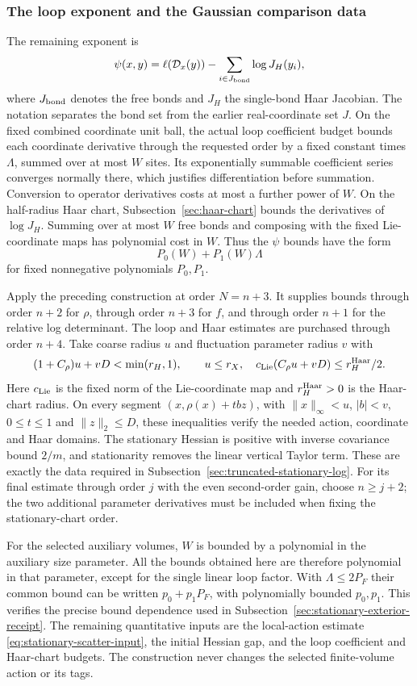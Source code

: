 \subsubsection{The loop exponent and the Gaussian comparison data}
The remaining exponent is
\[
      \psi(x,y)=\ell({\cal D}_x(y))-
                              \sum_{i\in J_{\rm bond}}\log J_H(y_i),
\]
where $J_{\rm bond}$ denotes the free bonds and $J_H$ the
single-bond Haar Jacobian. The notation separates the bond set
from the earlier real-coordinate set $J$.
On the fixed combined coordinate unit ball, the actual loop
coefficient budget bounds each coordinate derivative through the
requested order by a fixed constant times $\Lambda$, summed over
at most $W$ sites. Its exponentially summable coefficient series
converges normally there, which justifies differentiation before
summation. Conversion to operator derivatives costs at most a
further power of $W$. On the half-radius Haar chart,
Subsection~\ref{sec:haar-chart} bounds the derivatives of $\log J_H$.
Summing over at most $W$ free bonds and composing with the fixed
Lie-coordinate maps has polynomial cost in $W$. Thus the
$\psi$ bounds have the form
\[
                       P_0(W)+P_1(W)\Lambda
\]
for fixed nonnegative polynomials $P_0,P_1$.

Apply the preceding construction at order $N=n+3$. It supplies
bounds through order $n+2$ for $\rho$, through order $n+3$ for
$f$, and through order $n+1$ for the relative log determinant.
The loop and Haar estimates are purchased through order $n+4$.
Take coarse radius $u$ and fluctuation parameter radius $v$ with
\[
 (1+C_\rho)u+vD<\min(r_H,1),\qquad u\le r_X,
 \quad c_{\rm Lie}(C_\rho u+vD)\le r_H^{\rm Haar}/2.
\]
Here $c_{\rm Lie}$ is the fixed norm of the Lie-coordinate map
and $r_H^{\rm Haar}>0$ is the Haar-chart radius. On every segment
$(x,\rho(x)+tbz)$, with $\|x\|_\infty<u$, $|b|<v$,
$0\le t\le1$ and $\|z\|_2\le D$, these inequalities verify the
needed action, coordinate and Haar domains. The stationary
Hessian is positive with inverse covariance bound $2/m$, and
stationarity removes the linear vertical Taylor term.
These are exactly the data required in
Subsection~\ref{sec:truncated-stationary-log}. For its final estimate
through order $j$ with the even second-order gain, choose $n\ge j+2$;
the two additional parameter derivatives must be included when fixing
the stationary-chart order.

For the selected auxiliary volumes, $W$ is bounded by a polynomial
in the auxiliary size parameter. All the bounds obtained here are
therefore polynomial in that parameter, except for the single
linear loop factor. With $\Lambda\le2P_F$ their common bound can
be written $p_0+p_1P_F$, with polynomially bounded $p_0,p_1$.
This verifies the precise bound dependence used in
Subsection~\ref{sec:stationary-exterior-receipt}. The remaining
quantitative inputs are the local-action estimate
\eqref{eq:stationary-scatter-input}, the initial Hessian gap, and
the loop coefficient and Haar-chart budgets. The construction
never changes the selected finite-volume action or its tags.
